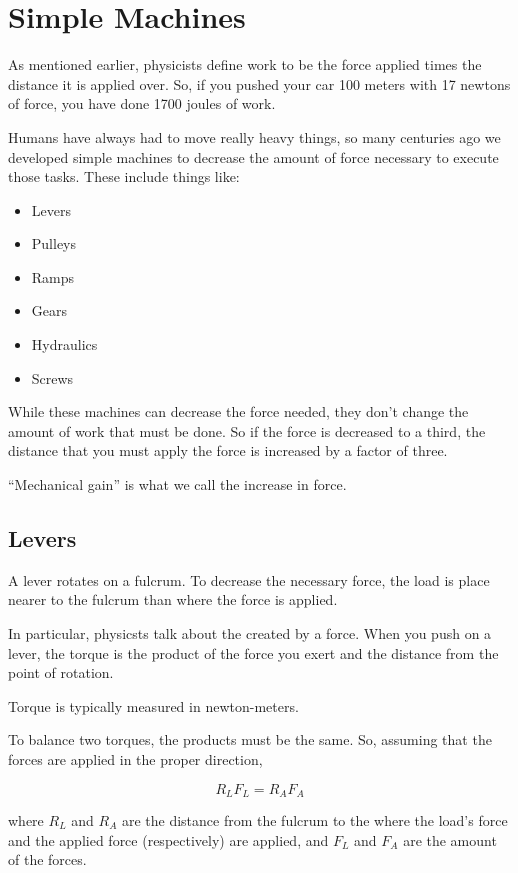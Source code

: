 \chapter{Simple Machines}

As mentioned earlier, physicists define work to be the force applied
times the distance it is applied over. So, if you pushed your car 100
meters with 17 newtons of force, you have done 1700 joules of work.

Humans have always had to move really heavy things, so many centuries
ago we developed simple machines to decrease the amount of force
necessary to execute those tasks. These include things like:
\begin{itemize}
\item Levers
\item Pulleys
\item Ramps
\item Gears
\item Hydraulics
\item Screws
\end{itemize}

While these machines can decrease the force needed, they don't change
the amount of work that must be done. So if the force is decreased to
a third, the distance that you must apply the force is increased by a
factor of three.

``Mechanical gain'' is what we call the increase in force.

\section{Levers}

A lever rotates on a fulcrum. To decrease the necessary force, the load
is place nearer to the fulcrum than where the force is applied.

In particular, physicsts talk about the  created by a
force. When you push on a lever, the torque is the product of the
force you exert and the distance from the point of rotation.

Torque is typically measured in newton-meters.

To balance two torques, the products must be the same. So, assuming
that the forces are applied in the proper direction,

$$R_L F_L = R_A F_A$$

where $R_L$ and $R_A$ are the distance from the fulcrum to the where
the load's force and the applied force (respectively) are applied, and
$F_L$ and $F_A$ are the amount of the forces.


